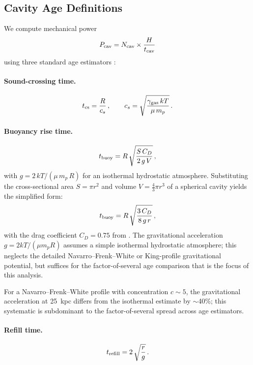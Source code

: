 \documentclass[twocolumn]{aastex63}
\newcommand{\Pcav}{P_{\rm cav}}
\newcommand{\tcav}{t_{\rm cav}}
\begin{document}
\subsection{Cavity Age Definitions}
\label{sec:ages}

We compute mechanical power
\begin{equation}
  \label{eq:pcav}
  \Pcav = N_{\rm cav} \times \frac{H}{\tcav}
\end{equation}
using three standard age estimators \citep{McNamara2007}:

\paragraph{Sound-crossing time.}
\begin{equation}
  \label{eq:tcs}
  t_{\rm cs} = \frac{R}{c_s}\,,\qquad
  c_s = \sqrt{\frac{\gamma_{\rm gas}\,kT}{\mu\,m_p}}\,.
\end{equation}

\paragraph{Buoyancy rise time.}
\begin{equation}
  \label{eq:tbuoy}
  t_{\rm buoy} = R\,\sqrt{\frac{S\,C_D}{2\,g\,V}}\,,
\end{equation}
with $g = 2\,kT / (\mu\,m_p\,R)$ for an isothermal hydrostatic atmosphere.
Substituting the cross-sectional area $S = \pi r^2$ and volume
$V = \tfrac{4}{3}\pi r^3$ of a spherical cavity yields the simplified form:
\begin{equation}
  \label{eq:tbuoy_simplified}
  t_{\rm buoy} = R\,\sqrt{\frac{3\,C_D}{8\,g\,r}}\,,
\end{equation}
with the drag coefficient $C_D = 0.75$ from \citet{Churazov2001}.
The gravitational acceleration $g = 2kT/(\mu m_p R)$ assumes a simple
isothermal hydrostatic atmosphere; this neglects the detailed Navarro--Frenk--White
or King-profile gravitational potential, but suffices for the factor-of-several
age comparison that is the focus of this analysis.

For a Navarro--Frenk--White profile with concentration $c \sim 5$,
the gravitational acceleration at 25~kpc differs from the isothermal
estimate by $\sim$40\%; this systematic is subdominant to the
factor-of-several spread across age estimators.

\paragraph{Refill time.}
\begin{equation}
  \label{eq:trefill}
  t_{\rm refill} = 2\,\sqrt{\frac{r}{g}}\,.
\end{equation}
\end{document}
